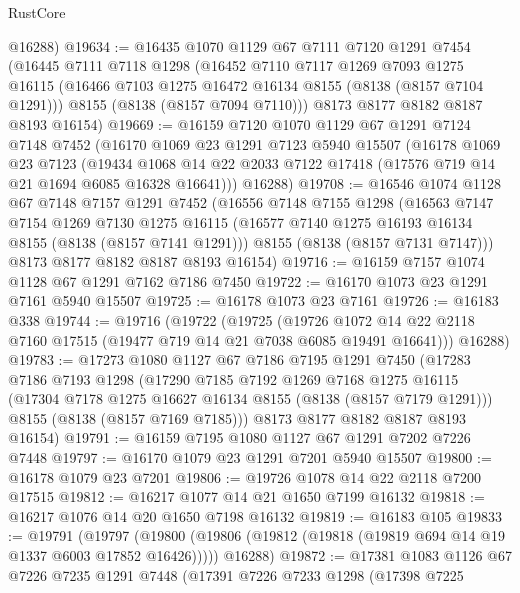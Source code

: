 \begin{lexlean}{RustCore}
\begin{coremodule}
      @16288)
@19634 := @16435
    @1070
    @1129
    @67
    @7111
    @7120
    @1291
    @7454
    (@16445
      @7111
      @7118
      @1298
      (@16452
        @7110
        @7117
        @1269
        @7093
        @1275
        @16115
        (@16466 @7103 @1275 @16472 @16134 @8155 (@8138 (@8157 @7104 @1291)))
        @8155
        (@8138 (@8157 @7094 @7110)))
      @8173
      @8177
      @8182
      @8187
      @8193
      @16154)
@19669 := @16159
    @7120
    @1070
    @1129
    @67
    @1291
    @7124
    @7148
    @7452
    (@16170
      @1069
      @23
      @1291
      @7123
      @5940
      @15507
      (@16178
        @1069
        @23
        @7123
        (@19434 @1068 @14 @22 @2033 @7122 @17418 (@17576 @719 @14 @21 @1694 @6085 @16328 @16641)))
      @16288)
@19708 := @16546
    @1074
    @1128
    @67
    @7148
    @7157
    @1291
    @7452
    (@16556
      @7148
      @7155
      @1298
      (@16563
        @7147
        @7154
        @1269
        @7130
        @1275
        @16115
        (@16577 @7140 @1275 @16193 @16134 @8155 (@8138 (@8157 @7141 @1291)))
        @8155
        (@8138 (@8157 @7131 @7147)))
      @8173
      @8177
      @8182
      @8187
      @8193
      @16154)
@19716 := @16159 @7157 @1074 @1128 @67 @1291 @7162 @7186 @7450
@19722 := @16170 @1073 @23 @1291 @7161 @5940 @15507
@19725 := @16178 @1073 @23 @7161
@19726 := @16183 @338
@19744 := @19716
    (@19722
      (@19725
        (@19726 @1072 @14 @22 @2118 @7160 @17515 (@19477 @719 @14 @21 @7038 @6085 @19491 @16641)))
      @16288)
@19783 := @17273
    @1080
    @1127
    @67
    @7186
    @7195
    @1291
    @7450
    (@17283
      @7186
      @7193
      @1298
      (@17290
        @7185
        @7192
        @1269
        @7168
        @1275
        @16115
        (@17304 @7178 @1275 @16627 @16134 @8155 (@8138 (@8157 @7179 @1291)))
        @8155
        (@8138 (@8157 @7169 @7185)))
      @8173
      @8177
      @8182
      @8187
      @8193
      @16154)
@19791 := @16159 @7195 @1080 @1127 @67 @1291 @7202 @7226 @7448
@19797 := @16170 @1079 @23 @1291 @7201 @5940 @15507
@19800 := @16178 @1079 @23 @7201
@19806 := @19726 @1078 @14 @22 @2118 @7200 @17515
@19812 := @16217 @1077 @14 @21 @1650 @7199 @16132
@19818 := @16217 @1076 @14 @20 @1650 @7198 @16132
@19819 := @16183 @105
@19833 := @19791
    (@19797
      (@19800 (@19806 (@19812 (@19818 (@19819 @694 @14 @19 @1337 @6003 @17852 @16426)))))
      @16288)
@19872 := @17381
    @1083
    @1126
    @67
    @7226
    @7235
    @1291
    @7448
    (@17391
      @7226
      @7233
      @1298
      (@17398
        @7225

\end{coremodule}
\end{lexlean}

